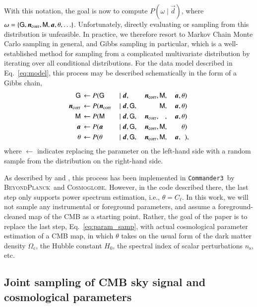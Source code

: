 \documentclass[twocolumn]{../common/aa}
\def\commanderthree{\texttt{Commander3}}
\renewcommand{\d}[0]{\vec{d}}
\renewcommand{\G}[0]{\tens{G}}
\newcommand{\n}[0]{\vec{n}}
\renewcommand{\a}[0]{\vec{a}}
\newcommand{\M}[0]{\tens{M}}
\newcommand{\BP}{\textsc{BeyondPlanck}}
\newcommand{\Cosmoglobe}{\textsc{Cosmoglobe}}
\newcommand{\data}{\vec d}
\newcommand{\ncorr}{\vec n_\mathrm{corr}}
\begin{document}
With this notation, the goal is now to compute $P(\omega\mid\d)$, where $\omega = \{\G, \n_{\mathrm{corr}}, \M, \a, \theta, \ldots\}$. Unfortunately, directly evaluating or sampling from this distribution is unfeasible. In practice, we therefore resort to Markov Chain Monte Carlo sampling in general, and Gibbs sampling in particular, which is a well-established method for sampling from a complicated multivariate distribution by iterating over all conditional distributions. For the data model described in Eq.~\eqref{eq:model}, this process may be described schematically in the form of a Gibbs chain, 
  \begin{alignat}{9}
    \label{eq:gain_samp_dist}\G &\,\leftarrow          P(\G&\,               \mid \data, &\,\phantom{\G,} &\,\ncorr,&\,\M, &\,\a, &\,\theta)\\
    \label{eq:ncorr_samp_dist} \ncorr &\,\leftarrow    P(\ncorr&\,        \mid \data, &\,\G, &\,\phantom{\ncorr,}  &\,\M, &\,\a, &\,\theta)\\
    \label{eq:beta_samp}\M &\,\leftarrow                     P(\M &\, \mid \data, &\,\G, &\,\ncorr, &\,\phantom{\M}, &\,\a, &\,\theta)\\
    \a &\,\leftarrow                                   P(\a&\,            \mid \data, &\,\G, &\,\ncorr, &\,\M, &\,\phantom{\a,} &\,\theta)\\
    \theta &\,\leftarrow                             P(\theta &\,         \mid \data, &\,\G, &\,\ncorr, &\,\M, &\,\a,&\,\phantom{\theta})\label{eq:param_samp},
    \end{alignat}
  where $\leftarrow$ indicates replacing the parameter on the left-hand side with a random sample from the distribution on the right-hand side.

As described by \citet{bp01} and \citet{watts2023_dr1}, this process has been implemented in \commanderthree\ by \BP\ and \Cosmoglobe. However, in the code described there, the last step only supports power spectrum estimation, i.e., $\theta = C_{\ell}$. In this work, we will not sample any instrumental or foreground parameters, and assume a foreground-cleaned map of the CMB as a starting point. Rather, the goal of the paper is to replace the last step, Eq.~\eqref{eq:param_samp}, with actual cosmological parameter estimation of a CMB map, in which $\theta$ takes on the usual form of the dark matter density $\Omega_\mathrm{c}$, the Hubble constant $H_0$, the spectral index of scalar perturbations $n_\mathrm{s}$, etc.

\subsection{Joint sampling of CMB sky signal and cosmological parameters}
\end{document}
